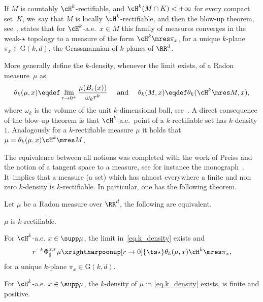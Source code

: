 If $M$ is countably $\cH^k$-rectifiable, and $\cH^k(M\cap K)<+\infty$ for every compact set~$K$, we~say that $M$ is locally $\cH^k$-rectifiable, and then the blow-up theorem, see~\cite[Th.\,10.2]{maggi2012sets}, states that for $\cH^k$-a.e.\ $x \in M$ this family of measures converges in the weak-$\star$ topology to a measure of the form $\cH^k \mres \pi_x$, for a unique $k$-plane $\pi_x \in \text{G}(k,d)$, the Grassmannian of $k$-planes of $\RR^d$.

More generally define the $k$-density, whenever the limit exists, of a Radon measure~$\mu$ as
\begin{equation}\label{eq.k_density}
\theta_k(\mu,x) \eqdef \lim_{r \to 0^+}
\frac{\mu(B_r(x))}{\omega_k r^k}\quad \text{ and }\quad
\theta_k(M,x) \eqdef \theta_k(\cH^k\mres M, x),
\end{equation}
where $\omega_k$ is the volume of the unit $k$-dimensional ball, see~\cite{ambrosio2000functions,maggi2012sets}. A direct consequence of the blow-up theorem is that $\cH^k$-a.e.~point of a $k$-rectifiable set has $k$-density $1$. Analogously for a $k$-rectifiable measure $\mu$ it holds that $\mu = \theta_k(\mu, x) \cH^k\mres M$.

The equivalence between all notions was completed with the work of Preiss and the notion of a tangent space to a measure, see for instance the monograph~\cite{delellis2006lecture}. It~implies that a measure (\resp a set) which has almost everywhere a finite and non zero $k$-density is $k$-rectifiable. In particular, one has the following theorem.

\begin{theorem}\label{theorem.rectifiability_tangentiability}
Let $\mu$ be a Radon measure over $\RR^d$, the following are equivalent.
\begin{enumeratei}
\item\label{theorem.rectifiability_tangentiabilityi}
$\mu$ is $k$-rectifiable.
\item\label{theorem.rectifiability_tangentiabilityii}
For $\cH^k$-a.e. $x \in \supp \mu$, the limit in~\eqref{eq.k_density} exists and
\[
r^{-k}\Phi^{x,r}_\sharp \mu \xrightharpoonup[r \to 0]{\ts\star} 
\theta_k(\mu,x)\cH^k\mres \pi_x,
\]
for a unique $k$-plane $\pi_x \in \text{G}(k,d)$.
\item\label{theorem.rectifiability_tangentiabilityiii}
For $\cH^k$-a.e. $x \in \supp \mu$, the $k$-density of $\mu$ in \eqref{eq.k_density} exists, is finite and positive.
\end{enumeratei}
\end{theorem}

